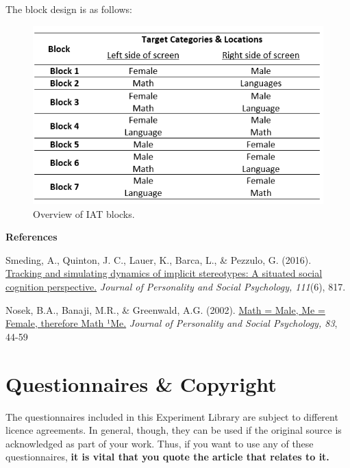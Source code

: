 \documentclass[
]{book}
\begin{document}
The block design is as follows:

\begin{figure}

{\centering \includegraphics[width=0.75\linewidth]{images/IAT_Design} 

}

\caption{Overview of IAT blocks.}\label{fig:Figure6-1}
\end{figure}

\textbf{References}

Smeding, A., Quinton, J. C., Lauer, K., Barca, L., \& Pezzulo, G. (2016). \href{https://www.researchgate.net/profile/Jean-Charles_Quinton/publication/308341625_Tracking_and_Simulating_Dynamics_of_Implicit_Stereotypes_A_Situated_Social_Cognition_Perspective/links/581b4c3508aea429b28fc0d0/Tracking-and-Simulating-Dynamics-of-Implicit-Stereotypes-A-Situated-Social-Cognition-Perspective.pdf}{Tracking and simulating dynamics of implicit stereotypes: A situated social cognition perspective.} \emph{Journal of Personality and Social Psychology, 111}(6), 817.

Nosek, B.A., Banaji, M.R., \& Greenwald, A.G. (2002). \href{https://psyarxiv.com/y2g6s}{Math = Male, Me = Female, therefore Math ¹Me.} \emph{Journal of Personality and Social Psychology, 83}, 44-59

\hypertarget{questionnaires-copyright}{%
\chapter{Questionnaires \& Copyright}\label{questionnaires-copyright}}

The questionnaires included in this Experiment Library are subject to different licence agreements. In general, though, they can be used if the original source is acknowledged as part of your work. Thus, if you want to use any of these questionnaires, \textbf{it is vital that you quote the article that relates to it.}
\end{document}
